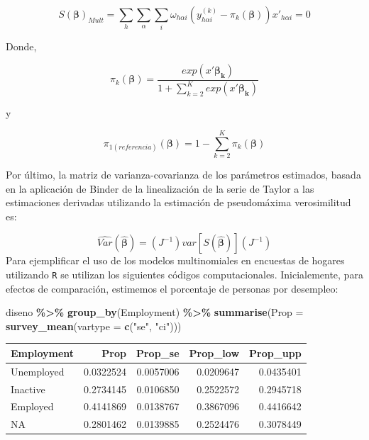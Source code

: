 \documentclass[
  spanish,
  12pt,
]{book}
\newenvironment{Shaded}{\begin{snugshade}}{\end{snugshade}}
\newcommand{\AttributeTok}[1]{\textcolor[rgb]{0.13,0.29,0.53}{#1}}
\newcommand{\FunctionTok}[1]{\textcolor[rgb]{0.13,0.29,0.53}{\textbf{#1}}}
\newcommand{\NormalTok}[1]{#1}
\newcommand{\SpecialCharTok}[1]{\textcolor[rgb]{0.81,0.36,0.00}{\textbf{#1}}}
\newcommand{\StringTok}[1]{\textcolor[rgb]{0.31,0.60,0.02}{#1}}
\begin{document}
\[
S\left(\boldsymbol{\beta}\right)_{Mult}  =  \sum_{h}\sum_{\alpha}\sum_{i}\omega_{h\alpha i}\left(y_{h\alpha i}^{\left(k\right)}-\pi_{k}\left(\boldsymbol{\beta}\right)\right)x'_{h\alpha i}=0
\]

Donde,

\[
\pi_{k}\left(\boldsymbol{\beta}\right)=\frac{exp\left(x'\boldsymbol{\beta_{k}}\right)}{1+{ \sum_{k=2}^{K}exp\left(x'\boldsymbol{\beta_{k}}\right)}}
\]

y

\[
\pi_{1\left(referencia\right)}\left(\boldsymbol{\beta}\right)=1-\sum_{k=2}^{K}\pi_{k}\left(\boldsymbol{\beta}\right)
\]

Por último, la matriz de varianza-covarianza de los parámetros estimados, basada en la aplicación de Binder de la linealización de la serie de Taylor a las estimaciones derivadas utilizando la estimación de pseudomáxima verosimilitud es:

\[
\hat{Var}\left(\hat{\boldsymbol{\beta}}\right)  =  \left(J^{-1}\right)var\left[S\left(\hat{\boldsymbol{\beta}}\right)\right]\left(J^{-1}\right)
\]
Para ejemplificar el uso de los modelos multinomiales en encuestas de hogares utilizando \texttt{R} se utilizan los siguientes códigos computacionales. Inicialemente, para efectos de comparación, estimemos el porcentaje de personas por desempleo:

\begin{Shaded}
\begin{Highlighting}[]
\NormalTok{diseno }\SpecialCharTok{\%\textgreater{}\%} \FunctionTok{group\_by}\NormalTok{(Employment) }\SpecialCharTok{\%\textgreater{}\%} 
  \FunctionTok{summarise}\NormalTok{(}\AttributeTok{Prop =} \FunctionTok{survey\_mean}\NormalTok{(}\AttributeTok{vartype =} \FunctionTok{c}\NormalTok{(}\StringTok{"se"}\NormalTok{, }\StringTok{"ci"}\NormalTok{)))}
\end{Highlighting}
\end{Shaded}

\begin{tabular}{l|r|r|r|r}
\hline
Employment & Prop & Prop\_se & Prop\_low & Prop\_upp\\
\hline
Unemployed & 0.0322524 & 0.0057006 & 0.0209647 & 0.0435401\\
\hline
Inactive & 0.2734145 & 0.0106850 & 0.2522572 & 0.2945718\\
\hline
Employed & 0.4141869 & 0.0138767 & 0.3867096 & 0.4416642\\
\hline
NA & 0.2801462 & 0.0139885 & 0.2524476 & 0.3078449\\
\hline
\end{tabular}
\end{document}
